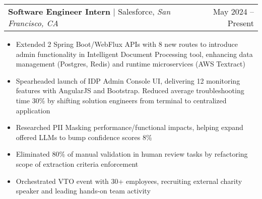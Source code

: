 \documentclass[letterpaper,11pt]{article}
\makeatletter
\newcommand{\resumeItem}[1]{
  \item\small{
    {#1 \vspace{-1pt}}
  }
}
\newcommand{\experienceHeading}[4]{
  \vspace{-2pt}\item
    \begin{tabular*}{1.00\textwidth}[t]{l@{\extracolsep{\fill}}r}
      \textbf{\small#1} | \small{#3}, \textit{\small #4} & \small{#2} \\
    \end{tabular*}\vspace{-7pt}
}
\newcommand{\resumeItemListStart}{\begin{itemize}
[leftmargin=0.2in]}
\newcommand{\resumeItemListEnd}{\end{itemize}}
\makeatother
\begin{document}
    \experienceHeading
      {Software Engineer Intern}{May 2024 -- Present}
      {Salesforce}{San Francisco, CA}
      \resumeItemListStart
        \resumeItem{Extended 2 Spring Boot/WebFlux APIs with 8 new routes to introduce admin functionality in Intelligent Document Processing tool, enhancing data management (Postgres, Redis) and runtime microservices (AWS Textract)}
        \resumeItem{Spearheaded launch of IDP Admin Console UI, delivering 12 monitoring features with AngularJS and Bootstrap. Reduced average troubleshooting time 30\% by shifting solution engineers from terminal to centralized application}
        \resumeItem{Researched PII Masking performance/functional impacts, helping expand offered LLMs to bump confidence scores 8\%}
        \resumeItem{Eliminated 80\% of manual validation in human review tasks by refactoring scope of extraction criteria enforcement}
        \resumeItem{Orchestrated VTO event with 30+ employees, recruiting external charity speaker and leading hands-on team activity}
      \resumeItemListEnd
  
\end{document}
